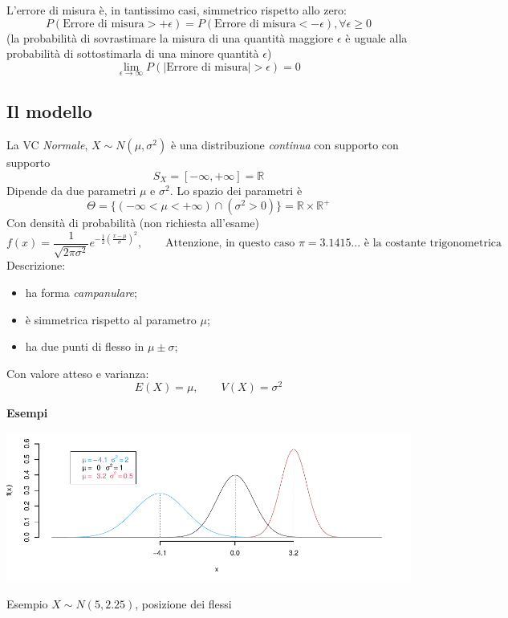\documentclass[
  11pt,
]{book}
\providecommand{\tightlist}{%
  \setlength{\itemsep}{0pt}\setlength{\parskip}{0pt}}
\theoremstyle{mytheoremstyle}
\theoremstyle{mydefstyle}
\begin{document}
L'errore di misura è, in tantissimo casi, simmetrico rispetto allo zero:
\[P(\text{Errore di misura}>+\epsilon)=P(\text{Errore di misura}<-\epsilon), \forall \epsilon\geq 0\]
(la probabilità di sovrastimare la misura di una quantità maggiore \(\epsilon\) è uguale alla probabilità di sottostimarla di una minore quantità \(\epsilon\))
\[\lim_{\epsilon\to\infty}P(|\text{Errore di misura}|> \epsilon)=0\]

\subsection{Il modello}\label{il-modello-2}

La VC \emph{Normale}, \(X\sim N(\mu,\sigma^2)\) è una distribuzione \emph{continua} con supporto
con supporto
\[S_X=[-\infty,+\infty]=\mathbb{R}\]
Dipende da due parametri \(\mu\) e \(\sigma^2\). Lo spazio dei parametri è
\[\Theta=\{(-\infty<\mu<+\infty)\cap(\sigma^2>0)\}=\mathbb{R}\times\mathbb{R}^+\]
Con densità di probabilità (non richiesta all'esame)
\[f(x)=\frac 1 {\sqrt{2\pi\sigma^2}}e^{-\frac 1 2 \left(\frac{x-\mu}{\sigma}\right)^2}, \qquad \text{Attenzione, in questo caso $\pi=3.1415...$ è la costante trigonometrica}\]
Descrizione:

\begin{itemize}
\tightlist
\item
  ha forma \emph{campanulare};
\item
  è simmetrica rispetto al parametro \(\mu\);
\item
  ha due punti di flesso in \(\mu\pm\sigma\);
\end{itemize}

Con valore atteso e varianza:
\[E(X)=\mu, \qquad V(X)=\sigma^2\]

\textbf{Esempi}

\begin{center}\includegraphics{Appunti_di_Statistica_2025_files/figure-latex/07c-Normale-3-1} \end{center}

Esempio \(X\sim N(5,2.25)\), posizione dei flessi
\end{document}
